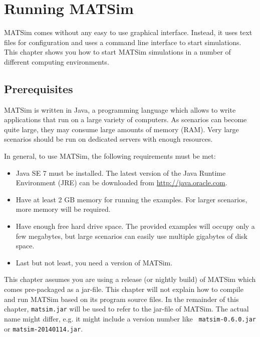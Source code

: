 \chapter{Running MATSim}
\label{sec:Running}

 
\bigskip

\begin{chapter-intro}
MATSim comes without any easy to use graphical interface. Instead, it uses text
files for configuration and uses a command line interface to start simulations.
This chapter shows you how to start MATSim simulations in a number of different
computing environments.
\end{chapter-intro}


\section{Prerequisites}

MATSim is written in Java, a programming language which allows to write
applications that run on a large variety of computers. As scenarios can become
quite large, they may consume large amounts of memory (RAM). Very large
scenarios should be run on dedicated servers with enough resources.

In general, to use MATSim, the following requirements must be met:
\begin{itemize}\styleItemize
  \item Java SE 7 must be installed. The latest version of the Java Runtime
  Environment (JRE) can be downloaded from \url{http://java.oracle.com}.
  \item Have at least 2 GB memory for running the examples. For larger
  scenarios, more memory will be required.
  \item Have enough free hard drive space. The provided examples will occupy
  only a few megabytes, but large scenarios can easily use multiple gigabytes of
  disk space.
  \item Last but not least, you need a version of MATSim.
\end{itemize}
This chapter assumes you are using a release (or nightly build) of MATSim which
comes pre-packaged as a jar-file. This chapter will not explain how to compile
and run MATSim based on its program source files. In the remainder of this
chapter, {\tt matsim.jar} will be used to refer to the jar-file of MATSim. The
actual name might differ, e.g. it might include a version number like {\tt
matsim-0.6.0.jar} or {\tt matsim-20140114.jar}.


